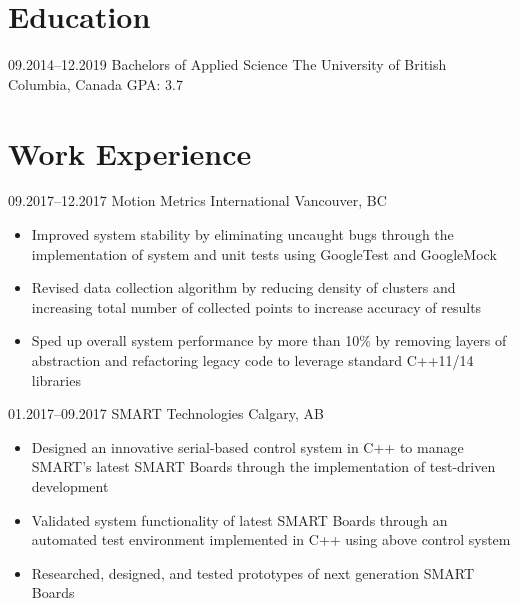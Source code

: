 \documentclass[]{cv-style}          %
\begin{document}
\section{Education}

\begin{entrylist}
\entry
{09.2014--12.2019}
{Bachelors {\normalfont of Applied Science}}
{The University of British Columbia, Canada}
{ {\hfill \normalfont GPA: 3.7}}
{\vspace{-0.3cm}}
\end{entrylist}


\section{Work Experience}

\begin{entrylist}
\entry
  {09.2017--12.2017}
  {Motion Metrics International}
  {Vancouver, BC}
  {
  \begin{itemize}[leftmargin=*]
    \item Improved system stability by eliminating uncaught bugs through the implementation of system and unit tests using GoogleTest and GoogleMock
    \item Revised data collection algorithm by reducing density of clusters and increasing total number of collected points to increase accuracy of results
    \item Sped up overall system performance by more than 10\% by removing layers of abstraction and refactoring legacy code to leverage standard C++11/14 libraries
  \end{itemize}}
\entry
  {01.2017--09.2017}
  {SMART Technologies}
  {Calgary, AB}
  {
  \begin{itemize}[leftmargin=*]
    \item Designed an innovative serial-based control system in C++ to manage SMART's latest SMART Boards through the implementation of test-driven development
    \item Validated system functionality of latest SMART Boards through an automated test environment implemented in C++ using above control system
    \item Researched, designed, and tested prototypes of next generation SMART Boards
  \end{itemize}}

\end{entrylist}
\end{document}
